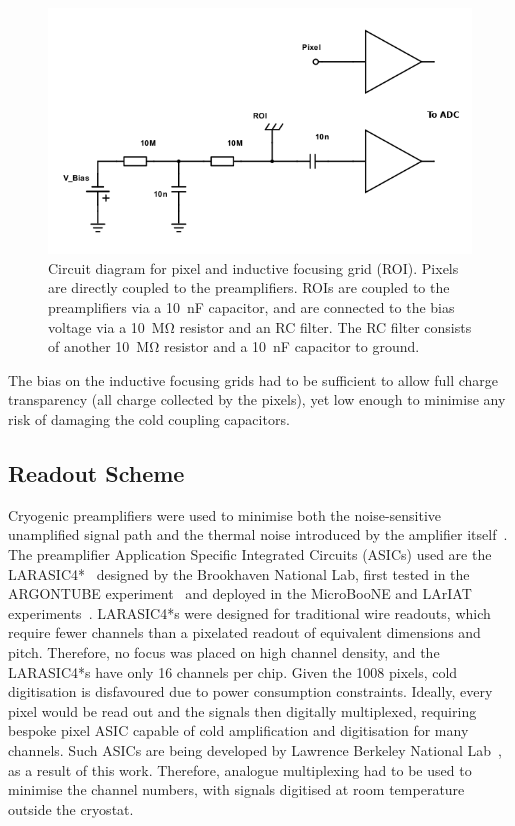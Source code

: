 \documentclass[instruments,article,submit,moreauthors,pdftex]{Definitions/mdpi}
\begin{document}
\begin{figure}[htb]
	\centering
	\includegraphics[width=0.65\linewidth]{Figures/schemeit-project_mod}
	\caption{Circuit diagram for pixel and inductive focusing grid (ROI). Pixels are directly coupled to the preamplifiers. ROIs are coupled to the preamplifiers via a \SI{10}{\nano\farad} capacitor, and are connected to the bias voltage via a \SI{10}{\mega\ohm} resistor and an RC filter. The RC filter consists of another \SI{10}{\mega\ohm} resistor and a \SI{10}{\nano\farad} capacitor to ground.}
	\label{fig:circuit}
\end{figure}

The bias on the inductive focusing grids had to be sufficient to allow full charge transparency (all charge collected by the pixels), yet low enough to minimise any risk of damaging the cold coupling capacitors.

\subsection{Readout Scheme}

Cryogenic preamplifiers were used to minimise both the noise-sensitive unamplified signal path and the thermal noise introduced by the amplifier itself~\cite{art_cold_ero}.
The preamplifier Application Specific Integrated Circuits (ASICs) used are the LARASIC4*~\cite{larasic} designed by the Brookhaven National Lab, first tested in the ARGONTUBE experiment~\cite{art_cold_ero} and deployed in the MicroBooNE and LArIAT experiments~\cite{uboner,lariat}.
LARASIC4*s were designed for traditional wire readouts, which require fewer channels than a pixelated readout of equivalent dimensions and pitch. 
Therefore, no focus was placed on high channel density, and the LARASIC4*s have only 16 channels per chip.
Given the 1008 pixels, cold digitisation is disfavoured due to power consumption constraints. 
Ideally, every pixel would be read out and the signals then digitally multiplexed, requiring bespoke pixel ASIC capable of cold amplification and digitisation for many channels.
Such ASICs are being developed by Lawrence Berkeley National Lab~\cite{larpix}, as a result of this work. 
Therefore, analogue multiplexing had to be used to minimise the channel numbers, with signals digitised at room temperature outside the cryostat.
\end{document}
